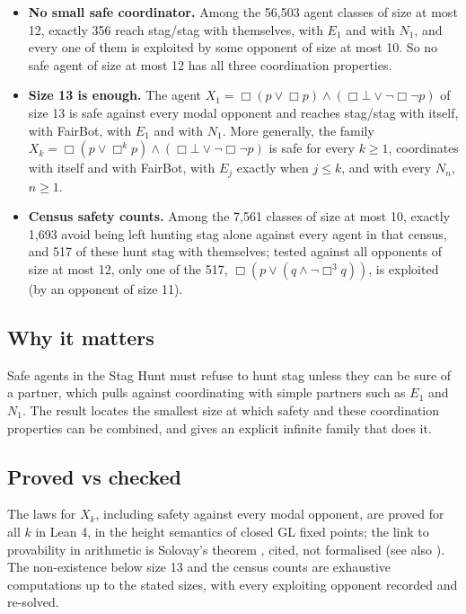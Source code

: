 \documentclass{article}
\begin{document}
\begin{itemize}
\item \textbf{No small safe coordinator.} Among the 56,503 agent classes of size at most 12, exactly 356 reach stag/stag with themselves, with $E_1$ and with $N_1$, and every one of them is exploited by some opponent of size at most 10. So no safe agent of size at most 12 has all three coordination properties.
\item \textbf{Size 13 is enough.} The agent $X_1 = \Box(p \vee \Box p) \wedge (\Box\bot \vee \neg\Box\neg p)$ of size 13 is safe against every modal opponent and reaches stag/stag with itself, with FairBot, with $E_1$ and with $N_1$. More generally, the family $X_k = \Box(p \vee \Box^k p) \wedge (\Box\bot \vee \neg\Box\neg p)$ is safe for every $k \ge 1$, coordinates with itself and with FairBot, with $E_j$ exactly when $j \le k$, and with every $N_n$, $n \ge 1$.
\item \textbf{Census safety counts.} Among the 7,561 classes of size at most 10, exactly 1,693 avoid being left hunting stag alone against every agent in that census, and 517 of these hunt stag with themselves; tested against all opponents of size at most 12, only one of the 517, $\Box(p \vee (q \wedge \neg\Box^3 q))$, is exploited (by an opponent of size 11).
\end{itemize}

\subsection*{Why it matters}

Safe agents in the Stag Hunt must refuse to hunt stag unless they can be sure of a partner, which
pulls against coordinating with simple partners such as $E_1$ and $N_1$. The result locates the
smallest size at which safety and these coordination properties can be combined, and gives an
explicit infinite family that does it.

\subsection*{Proved vs checked}

The laws for $X_k$, including safety against every modal opponent, are proved for all $k$ in
Lean 4, in the height semantics of closed GL fixed points; the link to provability in arithmetic
is Solovay's theorem \cite{solovay1976provability}, cited, not formalised (see also
\cite{boolos1993logic}). The non-existence below size 13 and the census counts are exhaustive
computations up to the stated sizes, with every exploiting opponent recorded and re-solved.
\end{document}
